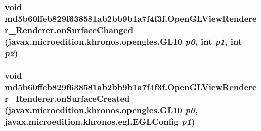 \hypertarget{classmd5b60ffeb829f638581ab2bb9b1a7f4f3f_1_1_open_g_l_view_renderer___renderer_6ec5c9b9fc4c374d02ce3788d6ad6a64}{
\subsubsection[{onSurfaceChanged}]{\setlength{\rightskip}{0pt plus 5cm}void md5b60ffeb829f638581ab2bb9b1a7f4f3f.OpenGLViewRenderer\_\-Renderer.onSurfaceChanged (javax.microedition.khronos.opengles.GL10 {\em p0}, \/  int {\em p1}, \/  int {\em p2})}}
\label{classmd5b60ffeb829f638581ab2bb9b1a7f4f3f_1_1_open_g_l_view_renderer___renderer_6ec5c9b9fc4c374d02ce3788d6ad6a64}


\hypertarget{classmd5b60ffeb829f638581ab2bb9b1a7f4f3f_1_1_open_g_l_view_renderer___renderer_7232536fa62d31b5e230568c18189110}{
\subsubsection[{onSurfaceCreated}]{\setlength{\rightskip}{0pt plus 5cm}void md5b60ffeb829f638581ab2bb9b1a7f4f3f.OpenGLViewRenderer\_\-Renderer.onSurfaceCreated (javax.microedition.khronos.opengles.GL10 {\em p0}, \/  javax.microedition.khronos.egl.EGLConfig {\em p1})}}
\label{classmd5b60ffeb829f638581ab2bb9b1a7f4f3f_1_1_open_g_l_view_renderer___renderer_7232536fa62d31b5e230568c18189110}




